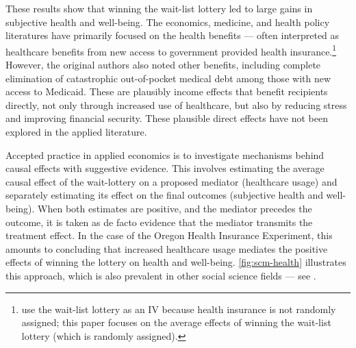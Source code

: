 These results show that winning the wait-list lottery led to large gains in subjective health and well-being.
The economics, medicine, and health policy literatures have primarily focused on the health benefits --- often interpreted as healthcare benefits from new access to government provided health insurance.\footnote{
    \cite{finkelstein2008oregon} use the wait-list lottery as an IV because health insurance is not randomly assigned; this paper focuses on the average effects of winning the wait-list lottery (which is randomly assigned).
}
However, the original authors also noted other benefits, including complete elimination of catastrophic out-of-pocket medical debt among those with new access to Medicaid.
These are plausibly income effects that benefit recipients directly, not only through increased use of healthcare, but also by reducing stress and improving financial security.
These plausible direct effects have not been explored in the applied literature.

Accepted practice in applied economics is to investigate mechanisms behind causal effects with suggestive evidence.
This involves estimating the average causal effect of the wait-lottery on a proposed mediator (healthcare usage) and separately estimating its effect on the final outcomes (subjective health and well-being).
When both estimates are positive, and the mediator precedes the outcome, it is taken as de facto evidence that the mediator transmits the treatment effect.
In the case of the Oregon Health Insurance Experiment, this amounts to concluding that increased healthcare usage mediates the positive effects of winning the lottery on health and well-being.
\autoref{fig:scm-health} illustrates this approach, which is also prevalent in other social science fields --- see \cite{blackwell2024assumption,green2010enough}.


